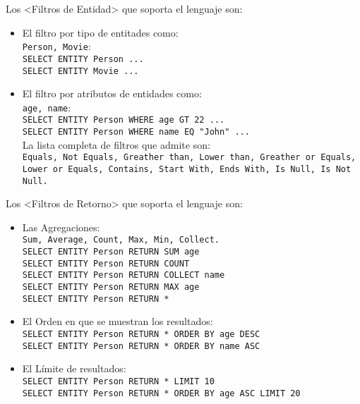 Los <Filtros de Entidad> que soporta el lenguaje son:
\begin{itemize}
    \item El filtro por tipo de entitades como:\\   
    \verb|Person, Movie|:\\
    \verb|SELECT ENTITY Person ...|\\
    \verb|SELECT ENTITY Movie ...|\\

    \item El filtro por atributos de entidades como:\\
    \verb|age, name|:\\
    \verb|SELECT ENTITY Person WHERE age GT 22 ...|\\
    \verb|SELECT ENTITY Person WHERE name EQ "John" ...|\\
    
    La lista completa de filtros que admite son:\\
    
    \verb|Equals, Not Equals, Greather than, Lower than, Greather or Equals,|\\
    \verb |Lower or Equals, Contains, Start With, Ends With, Is Null, Is Not Null.|\\

\end{itemize}

Los <Filtros de Retorno> que soporta el lenguaje son:
\begin{itemize}
    \item Las Agregaciones:\\
    \verb |Sum, Average, Count, Max, Min, Collect.|\\

    \verb|SELECT ENTITY Person RETURN SUM age|\\
    \verb|SELECT ENTITY Person RETURN COUNT|\\
    \verb|SELECT ENTITY Person RETURN COLLECT name|\\
    \verb|SELECT ENTITY Person RETURN MAX age|\\
    \verb|SELECT ENTITY Person RETURN *|\\


    \item El Orden en que se muestran los resultados:\\
    \verb|SELECT ENTITY Person RETURN * ORDER BY age DESC|\\
    \verb|SELECT ENTITY Person RETURN * ORDER BY name ASC|\\

    \item El L\'imite de resultados:\\
    \verb|SELECT ENTITY Person RETURN * LIMIT 10|\\
    \verb|SELECT ENTITY Person RETURN * ORDER BY age ASC LIMIT 20|\\
    
\end{itemize}

